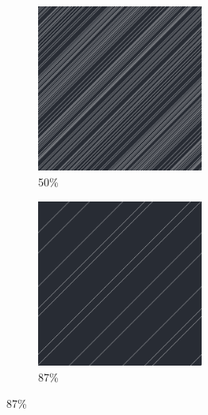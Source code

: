 \documentclass[12pt, fleqn]{report}                             %
\theoremstyle{break}                                            %
\begin{document}
\begin{figure}[ht!]
\begin{subfigure}[b]{0.4\linewidth}
          \includegraphics[width=0.6\textwidth]{Images/2/c.png}
          \caption{50\%}
        \end{subfigure}
        \begin{subfigure}[b]{0.4\linewidth}
          \includegraphics[width=0.6\textwidth]{Images/2/d.png}
          \caption{87\%}
        \end{subfigure}
      \end{figure}
\end{document}
